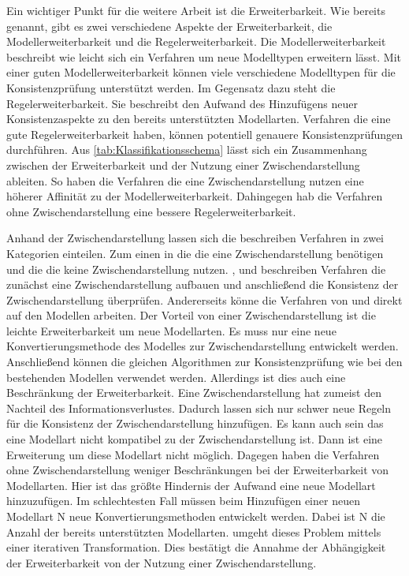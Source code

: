 Ein wichtiger Punkt für die weitere Arbeit ist die Erweiterbarkeit.
Wie bereits genannt, gibt es zwei verschiedene Aspekte der Erweiterbarkeit, die Modellerweiterbarkeit und die Regelerweiterbarkeit.
Die Modellerweiterbarkeit beschreibt wie leicht sich ein Verfahren um neue Modelltypen erweitern lässt.
Mit einer guten Modellerweiterbarkeit können viele verschiedene Modelltypen für die Konsistenzprüfung unterstützt werden.
Im Gegensatz dazu steht die Regelerweiterbarkeit.
Sie beschreibt den Aufwand des Hinzufügens neuer Konsistenzaspekte zu den bereits unterstützten Modellarten.
Verfahren die eine gute Regelerweiterbarkeit haben, können potentiell genauere Konsistenzprüfungen durchführen.
Aus \cref{tab:Klassifikationsschema} lässt sich ein Zusammenhang zwischen der Erweiterbarkeit und der Nutzung einer Zwischendarstellung ableiten.
So haben die Verfahren die eine Zwischendarstellung nutzen eine höherer Affinität zu der Modellerweiterbarkeit.
Dahingegen hab die Verfahren ohne Zwischendarstellung eine bessere Regelerweiterbarkeit.

Anhand der Zwischendarstellung lassen sich die beschreiben Verfahren in zwei Kategorien einteilen.
Zum einen in die die eine Zwischendarstellung benötigen und die die keine Zwischendarstellung nutzen.
\cite{Rasch2003}, \cite{Shinkawa2006} und \cite{Mens2005} beschreiben Verfahren die zunächst eine Zwischendarstellung aufbauen und anschließend die Konsistenz der Zwischendarstellung überprüfen.
Andererseits könne die Verfahren von \cite{Egyed2001} und \cite{Egyed2006} direkt auf den Modellen arbeiten.
Der Vorteil von einer Zwischendarstellung ist die leichte Erweiterbarkeit um neue Modellarten.
Es muss nur eine neue Konvertierungsmethode des Modelles zur Zwischendarstellung entwickelt werden.
Anschließend können die gleichen Algorithmen zur Konsistenzprüfung wie bei den bestehenden Modellen verwendet werden.
Allerdings ist dies auch eine Beschränkung der Erweiterbarkeit.
Eine Zwischendarstellung hat zumeist den Nachteil des Informationsverlustes.
Dadurch lassen sich nur schwer neue Regeln für die Konsistenz der Zwischendarstellung hinzufügen.
Es kann auch sein das eine Modellart nicht kompatibel zu der Zwischendarstellung ist.
Dann ist eine Erweiterung um diese Modellart nicht möglich.
Dagegen haben die Verfahren ohne Zwischendarstellung weniger Beschränkungen bei der Erweiterbarkeit von Modellarten.
Hier ist das größte Hindernis der Aufwand eine neue Modellart hinzuzufügen.
Im schlechtesten Fall müssen beim Hinzufügen einer neuen Modellart N neue Konvertierungsmethoden entwickelt werden.
Dabei ist N die Anzahl der bereits unterstützten Modellarten.
\cite{Egyed2001} umgeht dieses Problem mittels einer iterativen Transformation.
Dies bestätigt die Annahme der Abhängigkeit der Erweiterbarkeit von der Nutzung einer Zwischendarstellung.

